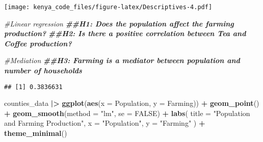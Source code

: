 \documentclass[
]{article}
\newenvironment{Shaded}{\begin{snugshade}}{\end{snugshade}}
\newcommand{\AttributeTok}[1]{\textcolor[rgb]{0.13,0.29,0.53}{#1}}
\newcommand{\CommentTok}[1]{\textcolor[rgb]{0.56,0.35,0.01}{\textit{#1}}}
\newcommand{\ConstantTok}[1]{\textcolor[rgb]{0.56,0.35,0.01}{#1}}
\newcommand{\DocumentationTok}[1]{\textcolor[rgb]{0.56,0.35,0.01}{\textbf{\textit{#1}}}}
\newcommand{\FunctionTok}[1]{\textcolor[rgb]{0.13,0.29,0.53}{\textbf{#1}}}
\newcommand{\NormalTok}[1]{#1}
\newcommand{\OtherTok}[1]{\textcolor[rgb]{0.56,0.35,0.01}{#1}}
\newcommand{\SpecialCharTok}[1]{\textcolor[rgb]{0.81,0.36,0.00}{\textbf{#1}}}
\newcommand{\StringTok}[1]{\textcolor[rgb]{0.31,0.60,0.02}{#1}}
\begin{document}
\texttt{[image: kenya\_code\_files/figure-latex/Descriptives-4.pdf]}

\begin{Shaded}
\begin{Highlighting}[]
\CommentTok{\#Linear regression}
\DocumentationTok{\#\#H1: Does the population affect the farming production?}
\DocumentationTok{\#\#H2: Is there a positive correlation between Tea and Coffee production?}


\CommentTok{\#Mediation}
\DocumentationTok{\#\#H3: Farming is a mediator between population and number of households}
\end{Highlighting}
\end{Shaded}

\begin{Shaded}
\end{Shaded}

\begin{verbatim}
## [1] 0.3836631
\end{verbatim}

\begin{Shaded}
\begin{Highlighting}[]
\NormalTok{counties\_data }\SpecialCharTok{|\textgreater{}} 
  \FunctionTok{ggplot}\NormalTok{(}\FunctionTok{aes}\NormalTok{(}\AttributeTok{x =}\NormalTok{ Population, }\AttributeTok{y =}\NormalTok{ Farming)) }\SpecialCharTok{+}
  \FunctionTok{geom\_point}\NormalTok{() }\SpecialCharTok{+}
  \FunctionTok{geom\_smooth}\NormalTok{(}\AttributeTok{method =} \StringTok{"lm"}\NormalTok{, }\AttributeTok{se =} \ConstantTok{FALSE}\NormalTok{) }\SpecialCharTok{+}
  \FunctionTok{labs}\NormalTok{(}
    \AttributeTok{title =} \StringTok{"Population and Farming Production"}\NormalTok{,}
    \AttributeTok{x =} \StringTok{"Population"}\NormalTok{,}
    \AttributeTok{y =} \StringTok{"Farming"}
\NormalTok{  ) }\SpecialCharTok{+}
  \FunctionTok{theme\_minimal}\NormalTok{()}
\end{Highlighting}
\end{Shaded}
\end{document}
